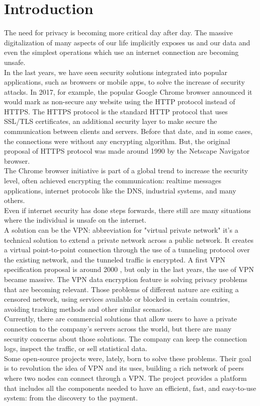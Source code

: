 \documentclass[]{article}
\begin{document}
	\section{Introduction}
	The need for privacy is becoming more critical day after day. The massive digitalization of many aspects of our life implicitly exposes us and our data and even the simplest operations which use an internet connection are becoming unsafe.\\
	In the last years, we have seen security solutions integrated into popular applications, such as browsers or mobile apps, to solve the increase of security attacks. In 2017, for example, the popular Google Chrome browser announced it would mark as non-secure any website using the HTTP protocol instead of HTTPS. The HTTPS protocol is the standard HTTP protocol that uses SSL/TLS certificates, an additional security layer to make secure the communication between clients and servers. Before that date, and in some cases, the connections were without any encrypting algorithm. But, the original proposal of HTTPS protocol was made around 1990 by the Netscape Navigator browser.\\
	The Chrome browser initiative is part of a global trend to increase the security level, often achieved encrypting the communication: realtime messages applications, internet protocols like the DNS, industrial systems, and many others.\\
	Even if internet security has done steps forwards, there still are many situations where the individual is unsafe on the internet.\\
	A solution can be the VPN: abbreviation for "virtual private network" it's a technical solution to extend a private network across a public network. It creates a virtual point-to-point connection through the use of a tunneling protocol over the existing network, and the tunneled traffic is encrypted. A first VPN specification proposal is around 2000 \cite{VPNRFC}, but only in the last years, the use of VPN became massive. The VPN data encryption feature is solving privacy problems that are becoming relevant. Those problems of different nature are exiting a censored network, using services available or blocked in certain countries, avoiding tracking methods and other similar scenarios.\\
	Currently, there are commercial solutions that allow users to have a private connection to the company's servers across the world, but there are many security concerns about those solutions. The company can keep the connection logs, inspect the traffic, or sell statistical data.\\
    Some open-source projects were, lately, born to solve these problems. Their goal is to revolution the idea of VPN and its uses, building a rich network of peers where two nodes can connect through a VPN. The project provides a platform that includes all the components needed to have an efficient, fast, and easy-to-use system: from the discovery to the payment.\\
    
\end{document}
